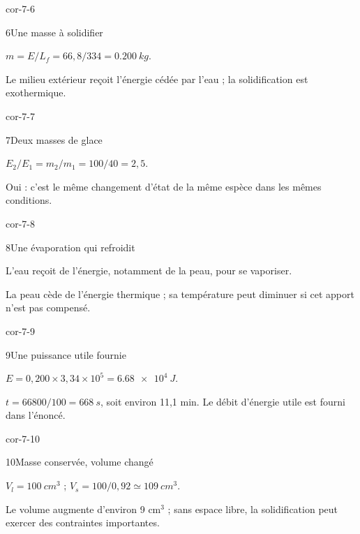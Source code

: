 \begin{blocLivre}{cor-7-6}\begin{corrige}{6}{Une masse à solidifier}
\begin{questions}
\item $m=E/L_f=66,8/334=\qty{0,200}{kg}$.
\item Le milieu extérieur reçoit l’énergie cédée par l’eau ; la solidification est exothermique.
\end{questions}
\end{corrige}\end{blocLivre}
\begin{blocLivre}{cor-7-7}\begin{corrige}{7}{Deux masses de glace}
\begin{questions}
\item $E_2/E_1=m_2/m_1=100/40=2,5$.
\item Oui : c’est le même changement d’état de la même espèce dans les mêmes conditions.
\end{questions}
\end{corrige}\end{blocLivre}
\begin{blocLivre}{cor-7-8}\begin{corrige}{8}{Une évaporation qui refroidit}
\begin{questions}
\item L’eau reçoit de l’énergie, notamment de la peau, pour se vaporiser.
\item La peau cède de l’énergie thermique ; sa température peut diminuer si cet apport n’est pas compensé.
\end{questions}
\end{corrige}\end{blocLivre}
\begin{blocLivre}{cor-7-9}\begin{corrige}{9}{Une puissance utile fournie}
\begin{questions}
\item $E=0,200\times3,34\times10^5=\qty{6,68e4}{J}$.
\item $t=66800/100=\qty{668}{s}$, soit environ 11,1 min. Le débit d’énergie utile est fourni dans l’énoncé.
\end{questions}
\end{corrige}\end{blocLivre}
\begin{blocLivre}{cor-7-10}\begin{corrige}{10}{Masse conservée, volume changé}
\begin{questions}
\item $V_l=\qty{100}{cm^3}$ ; $V_s=100/0,92\simeq\qty{109}{cm^3}$.
\item Le volume augmente d’environ 9 cm$^3$ ; sans espace libre, la solidification peut exercer des contraintes importantes.
\end{questions}
\end{corrige}\end{blocLivre}

